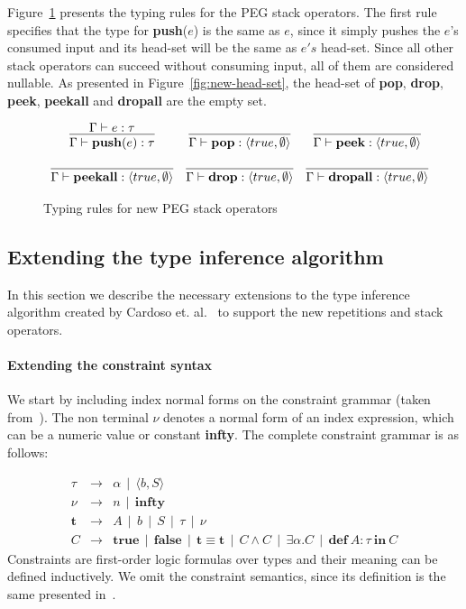 \documentclass[preprint,12pt]{elsarticle}
\theoremstyle{definition}
\begin{document}
Figure~\ref{fig:typing-stack} presents the typing rules for the PEG stack
operators. The first rule specifies that the type for \textbf{push}($e$) is
the same as $e$, since it simply pushes the $e$'s consumed input and its
head-set will be the same as $e's$ head-set. Since all other stack operators
can succeed without consuming input, all of them are considered nullable.
As presented in Figure~\ref{fig:new-head-set}, the head-set of \textbf{pop},
\textbf{drop}, \textbf{peek}, \textbf{peekall} and \textbf{dropall} are the
empty set.

\begin{figure}[H]
  \[
    \begin{array}{ccc}
      \infer{\Gamma \vdash \mathbf{push}(e) : \tau}
            {\Gamma \vdash e : \tau}
      &
      \infer{\Gamma \vdash \mathbf{pop} : \langle true, \emptyset\rangle}{} &
      \infer{\Gamma \vdash \mathbf{peek} : \langle true, \emptyset\rangle}{} \\ & \\
      \infer{\Gamma \vdash \mathbf{peekall} : \langle true, \emptyset\rangle}{} &
      \infer{\Gamma \vdash \mathbf{drop} : \langle true, \emptyset\rangle}{} &
      \infer{\Gamma \vdash \mathbf{dropall} : \langle true, \emptyset\rangle}{}
    \end{array}
  \]
  \caption{Typing rules for new PEG stack operators}
  \label{fig:typing-stack}
\end{figure}

\subsection{Extending the type inference algorithm}

In this section we describe the necessary extensions to the type inference algorithm
created by Cardoso et. al.~\cite{Cardoso23} to support the new repetitions and
stack operators.

\paragraph{Extending the constraint syntax} We start by including index normal forms
on the constraint grammar (taken from~\cite{Cardoso23}). The non terminal $\nu$ denotes
a normal form of an index expression, which can be a numeric value or
constant \textbf{infty}. The complete constraint grammar is as follows:

  \[
    \begin{array}{lcl}
      \tau & \to & \alpha\,\mid\,\langle b, S \rangle\\
      \nu & \to & n\,\mid\,\mathbf{infty}\\
      \mathbf{t} & \to & A\,\mid\,b\,\mid\,S\,\mid\,\tau\,\mid\,\nu\\
      C    & \to & \mathbf{true}\,\mid\,\mathbf{false}\,\mid\,\mathbf{t} \equiv \mathbf{t}\,\mid\,C \land C\,\mid\, \exists
                   \alpha.C\,\mid\, \mathbf{def}\:A :\tau\:\mathbf{in}\:C
    \end{array}
  \]
Constraints are first-order logic formulas over types and their meaning
can be defined inductively. We omit the constraint semantics, since its
definition is the same presented in~\cite{Cardoso23}.
\end{document}
